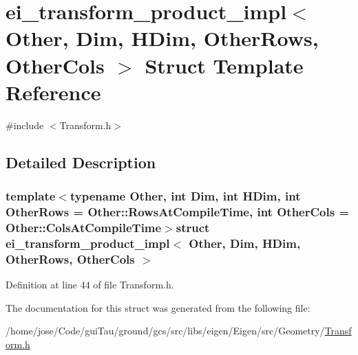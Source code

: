 \hypertarget{structei__transform__product__impl}{\section{ei\-\_\-transform\-\_\-product\-\_\-impl$<$ Other, Dim, H\-Dim, Other\-Rows, Other\-Cols $>$ Struct Template Reference}
\label{structei__transform__product__impl}
}


{\ttfamily \#include $<$Transform.\-h$>$}



\subsection{Detailed Description}
\subsubsection*{template$<$typename Other, int Dim, int H\-Dim, int Other\-Rows = Other\-::\-Rows\-At\-Compile\-Time, int Other\-Cols = Other\-::\-Cols\-At\-Compile\-Time$>$struct ei\-\_\-transform\-\_\-product\-\_\-impl$<$ Other, Dim, H\-Dim, Other\-Rows, Other\-Cols $>$}



Definition at line 44 of file Transform.\-h.



The documentation for this struct was generated from the following file\-:\begin{DoxyCompactItemize}
\item 
/home/jose/\-Code/gui\-Tau/ground/gcs/src/libs/eigen/\-Eigen/src/\-Geometry/\hyperlink{_transform_8h}{Transform.\-h}\end{DoxyCompactItemize}
